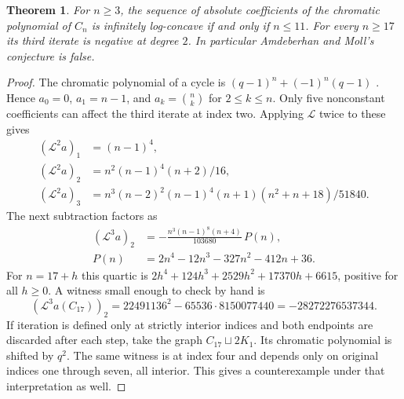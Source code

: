\documentclass[11pt,a4paper]{article}
\newtheorem{theorem}{Theorem}[section]
\theoremstyle{definition}\newtheorem{problem}[theorem]{Problem}
\begin{document}
\begin{theorem}\label{thm:cycle}
For $n\ge3$, the sequence of absolute coefficients of the chromatic
polynomial of $C_n$ is infinitely log-concave if and only if $n\le11$.
For every $n\ge17$ its third iterate is negative at degree $2$.
In particular Amdeberhan and Moll's conjecture is false.
\end{theorem}
\begin{proof}
The chromatic polynomial of a cycle is
$(q-1)^n+(-1)^n(q-1)$ \cite{am}. Hence $a_0=0$, $a_1=n-1$, and
$a_k=\binom nk$ for $2\le k\le n$. Only five nonconstant
coefficients can affect the third iterate at index two. Applying
$\mathcal L$ twice to these gives
\begin{align*}
 (\mathcal L^2a)_1&=(n-1)^4,\\
 (\mathcal L^2a)_2&=n^2(n-1)^4(n+2)/16,\\
 (\mathcal L^2a)_3&=n^3(n-2)^2(n-1)^4(n+1)(n^2+n+18)/51840 .
\end{align*}
The next subtraction factors as
\begin{align}
 (\mathcal L^3a)_2&=-\frac{n^3(n-1)^8(n+4)}{103680}\,P(n),\label{eq:cycle}\\
 P(n)&=2n^4-12n^3-327n^2-412n+36.\nonumber
\end{align}
For $n=17+h$ this quartic is
$2h^4+124h^3+2529h^2+17370h+6615$, positive for all $h\ge0$.
A witness small enough to check by hand is
\[
 (\mathcal L^3 a(C_{17}))_2
 =22491136^2-65536\cdot8150077440
 =-28272276537344 .
\]
If iteration is defined only at strictly interior indices and both
endpoints are discarded after each step, take the graph
$C_{17}\sqcup 2K_1$. Its chromatic polynomial is shifted by $q^2$.
The same witness is at index four and depends only on original
indices one through seven, all interior. This gives a counterexample
under that interpretation as well.


\end{proof}
\end{document}
